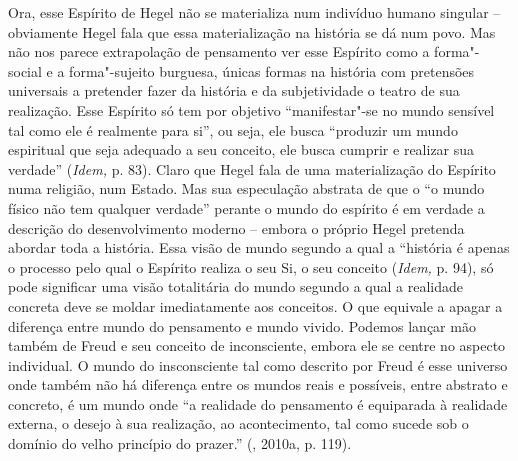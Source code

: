 {Ora, esse Espírito de Hegel não se materializa num indivíduo humano
singular -- obviamente Hegel fala que essa materialização na história se
dá num povo. Mas não nos parece extrapolação de pensamento ver esse
Espírito como a forma"-social e a forma"-sujeito burguesa, únicas formas
na história com pretensões universais a pretender fazer da história e da
subjetividade o teatro de sua realização. Esse Espírito só tem por
objetivo ``manifestar"-se no mundo sensível tal como ele é realmente para
si'', ou seja, ele busca ``produzir um mundo espiritual que seja
adequado a seu conceito, ele busca cumprir e realizar sua verdade''
(\emph{Idem,} p. 83). Claro que Hegel fala de uma materialização do
Espírito numa religião, num Estado. Mas sua especulação abstrata de que
o ``o mundo físico não tem qualquer verdade'' perante o mundo do
espírito é em verdade a descrição do desenvolvimento moderno -- embora o
próprio Hegel pretenda abordar toda a história. Essa visão de mundo
segundo a qual a ``história é apenas o processo pelo qual o Espírito
realiza o seu Si, o seu conceito (\emph{Idem,} p. 94), só pode
significar uma visão totalitária do mundo segundo a qual a realidade
concreta deve se moldar imediatamente aos conceitos. O que equivale a
apagar a diferença entre mundo do pensamento e mundo vivido. Podemos
lançar mão também de Freud e seu conceito de inconsciente, embora ele se
centre no aspecto individual. O mundo do insconsciente tal como descrito
por Freud é esse universo onde também não há diferença entre os mundos
reais e possíveis, entre abstrato e concreto, é um mundo onde ``a
realidade do pensamento é equiparada à realidade externa, o desejo à sua
realização, ao acontecimento, tal como sucede sob o domínio do velho
princípio do prazer.'' (, 2010a, p. 119).

}
